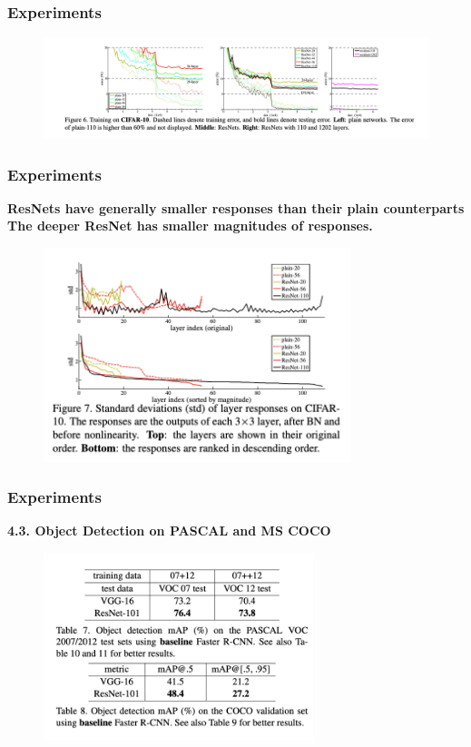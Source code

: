 \documentclass[
	11pt, %
]{beamer}
\begin{document}
\begin{frame}
	\frametitle{Experiments}

	\begin{figure}
		\centering
		\includegraphics[width=\textwidth]{./images/Screenshot 2025-05-20 at 0.41.53.png}
	\end{figure}
\end{frame}

\begin{frame}
	\frametitle{Experiments}

	\textbf{ResNets have generally smaller responses than their plain counterparts}\\
	\textbf{The deeper ResNet has smaller magnitudes of responses.}

	\begin{figure}
		\centering
		\includegraphics[width=0.8\textwidth]{./images/Screenshot 2025-05-20 at 0.42.53.png}
	\end{figure}
\end{frame}

\begin{frame}
	\frametitle{Experiments}

	\textbf{4.3. Object Detection on PASCAL and MS COCO} 

	\begin{figure}
		\centering
		\includegraphics[width=0.7\textwidth]{./images/Screenshot 2025-05-20 at 0.44.13.png}
	\end{figure}
\end{frame}
\end{document}
